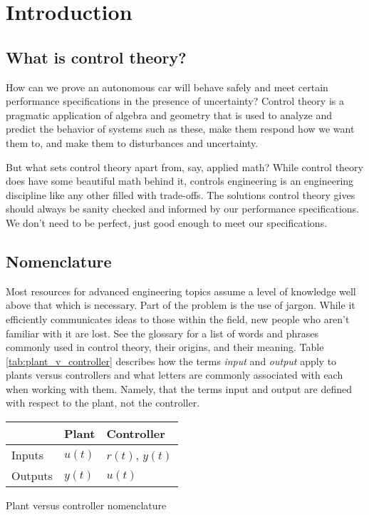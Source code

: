 
\chapter{Introduction}

\section{What is control theory?}

How can we prove an autonomous car will behave safely and meet certain
performance specifications in the presence of uncertainty? Control theory is a
pragmatic application of algebra and geometry that is used to analyze and
predict the behavior of \glspl{system} such as these, make them respond how we
want them to, and make them  to \glspl{disturbance}
and uncertainty.

But what sets control theory apart from, say, applied math? While control theory
does have some beautiful math behind it, controls engineering is an engineering
discipline like any other filled with trade-offs. The solutions control theory
gives should always be sanity checked and informed by our performance
specifications. We don't need to be perfect, just good enough to meet our
specifications.

\section{Nomenclature}

Most resources for advanced engineering topics assume a level of knowledge well
above that which is necessary. Part of the problem is the use of jargon. While
it efficiently communicates ideas to those within the field, new people who
aren't familiar with it are lost. See the glossary for a list of words and
phrases commonly used in control theory, their origins, and their meaning. Table
\ref{tab:plant_v_controller} describes how the terms \textit{input} and
\textit{output} apply to \glspl{plant} versus \glspl{controller} and what
letters are commonly associated with each when working with them. Namely, that
the terms input and output are defined with respect to the \gls{plant}, not the
\gls{controller}.

\begin{booktable}
  \begin{tabular}{|l|ll|}
    \hline
    \rowcolor{headingbg}
    & \textbf{Plant} & \textbf{Controller} \\
    \hline
    Inputs & $u(t)$ & $r(t)$, $y(t)$ \\
    Outputs & $y(t)$ & $u(t)$ \\
    \hline
  \end{tabular}
  \caption{Plant versus controller nomenclature}
  \label{tab:plant_v_controller}
\end{booktable}

